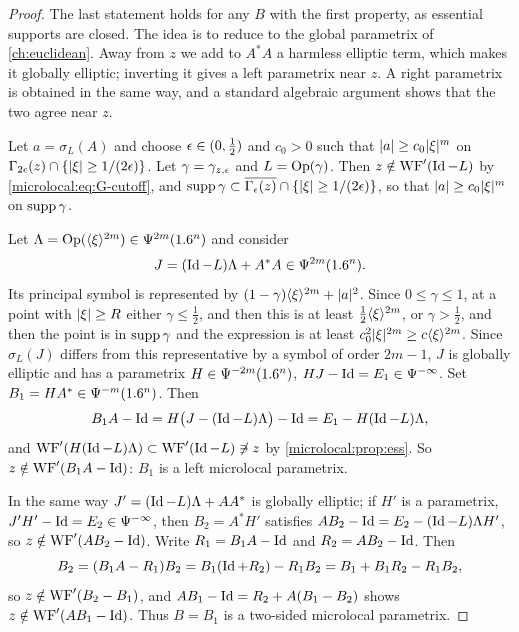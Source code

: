 \begin{proof}
  The last statement holds for any $B$ with the first property, as essential
  supports are closed. The idea is to reduce to the global parametrix of
  \cref{ch:euclidean}. Away from $z$ we add to $A^*A$ a harmless elliptic
  term, which makes it globally elliptic; inverting it gives a left
  parametrix near $z$. A right parametrix is obtained in the same way, and
  a standard algebraic argument shows that the two agree near $z$.

  Let $a=\sigma_L(A)$ and choose $\epsilon\in(0,\frac12)$
  and $c_0>0$ such that $\lvert a\rvert\ge c_0\lvert \xi\rvert^m$ on
  $\Gamma_{2\epsilon}(z)\cap\{\lvert \xi\rvert\ge1/(2\epsilon)\}$. Let $\gamma=\gamma_{z,\epsilon}$
  and $L=\operatorname{Op}(\gamma)$. Then $z\notin\operatorname{WF}'(\operatorname{Id}-L)$ by
  \eqref{microlocal:eq:G-cutoff}, and $\operatorname{supp}\gamma\subset
  \overline{\Gamma_\epsilon(z)}\cap\{\lvert \xi\rvert\ge1/(2\epsilon)\}$, so that
  $\lvert a\rvert\ge c_0\lvert \xi\rvert^m$ on $\operatorname{supp}\gamma$.

  Let $\Lambda=\operatorname{Op}(\langle \xi\rangle^{2m})\in\Psi^{2m}(1.6^n)$ and consider
  \begin{equation*}
    J=(\operatorname{Id}-L)\Lambda+A^*A\in\Psi^{2m}(1.6^n).
  \end{equation*}
  Its principal symbol is represented by
  $(1-\gamma)\langle \xi\rangle^{2m}+\lvert a\rvert^2$. Since $0\le\gamma\le1$, at a point
  with $\lvert \xi\rvert\ge R$ either $\gamma\le\frac12$, and then this is at least
  $\frac12\langle \xi\rangle^{2m}$, or $\gamma>\frac12$, and then the point is in
  $\operatorname{supp}\gamma$ and the expression is at least
  $c_0^2\lvert \xi\rvert^{2m}\ge c\langle \xi\rangle^{2m}$. Since $\sigma_L(J)$ differs from this
  representative by a symbol of order $2m-1$, $J$ is globally elliptic and
  has a parametrix $H\in\Psi^{-2m}(1.6^n)$, $HJ-\operatorname{Id}=E_1\in\Psi^{-\infty}$.
  Set $B_1=HA^*\in\Psi^{-m}(1.6^n)$. Then
  \begin{equation*}
    B_1A-\operatorname{Id}=H\bigl(J-(\operatorname{Id}-L)\Lambda\bigr)-\operatorname{Id}=E_1-H(\operatorname{Id}-L)\Lambda,
  \end{equation*}
  and $\operatorname{WF}'(H(\operatorname{Id}-L)\Lambda)\subset\operatorname{WF}'(\operatorname{Id}-L)\not\ni z$ by
  \cref{microlocal:prop:ess}. So $z\notin\operatorname{WF}'(B_1A-\operatorname{Id})$: $B_1$ is a left
  microlocal parametrix.

  In the same way $J'=(\operatorname{Id}-L)\Lambda+AA^*$ is globally elliptic; if $H'$ is
  a parametrix, $J'H'-\operatorname{Id}=E_2\in\Psi^{-\infty}$, then $B_2=A^*H'$ satisfies
  $AB_2-\operatorname{Id}=E_2-(\operatorname{Id}-L)\Lambda H'$, so $z\notin\operatorname{WF}'(AB_2-\operatorname{Id})$. Write
  $R_1=B_1A-\operatorname{Id}$ and $R_2=AB_2-\operatorname{Id}$. Then
  \begin{equation*}
    B_2=(B_1A-R_1)B_2=B_1(\operatorname{Id}+R_2)-R_1B_2=B_1+B_1R_2-R_1B_2,
  \end{equation*}
  so $z\notin\operatorname{WF}'(B_2-B_1)$, and $AB_1-\operatorname{Id}=R_2+A(B_1-B_2)$ shows
  $z\notin\operatorname{WF}'(AB_1-\operatorname{Id})$. Thus $B=B_1$ is a two-sided microlocal parametrix.
\end{proof}

